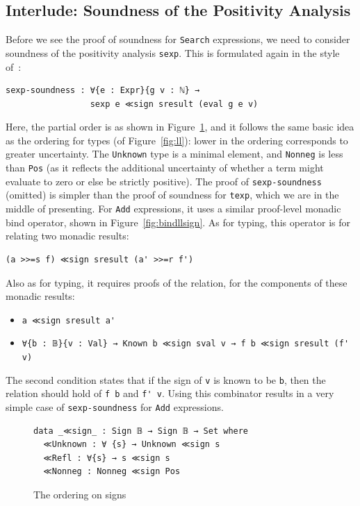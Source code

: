 \documentclass[acmsmall,screen,review]{acmart}
\begin{document}
\subsection{Interlude: Soundness of the Positivity Analysis}

Before we see the proof of soundness for \verb|Search| expressions,
we need to consider soundness of the positivity analysis \verb|sexp|.
This is formulated again in the style of~\citet{garby+25}:
\begin{verbatim}
sexp-soundness : ∀{e : Expr}{g v : ℕ} →
                 sexp e ≪sign sresult (eval g e v)
\end{verbatim}
\noindent Here, the partial order is as shown in
Figure~\ref{fig:signll}, and it follows the same basic idea as the
ordering for types (of Figure~\ref{fig:ll}): lower in the ordering
corresponds to greater uncertainty.  The \verb|Unknown| type is a
minimal element, and \verb|Nonneg| is less than \verb|Pos| (as it
reflects the additional uncertainty of whether a term might evaluate
to zero or else be strictly positive).  The proof of
\verb|sexp-soundness| (omitted) is simpler than the proof of soundness for
\verb|texp|, which we are in the middle of presenting.  For \verb|Add|
expressions, it uses a similar proof-level monadic bind operator,
shown in Figure~\ref{fig:bindllsign}.  As for typing, this operator is
for relating two monadic results:
\begin{verbatim}
(a >>=s f) ≪sign sresult (a' >>=r f')
\end{verbatim}
\noindent Also as for typing, it requires proofs of the relation, for the components of these
monadic results:
\begin{itemize}
\item \verb|a ≪sign sresult a'|
\item \verb|∀{b : 𝔹}{v : Val} → Known b ≪sign sval v → f b ≪sign sresult (f' v)|
\end{itemize}
\noindent The second condition states that if the sign of \verb|v| is known to be \verb|b|, then the
relation should hold of \verb|f b| and \verb|f' v|.  Using this combinator results in a very
simple case of \verb|sexp-soundness| for \verb|Add| expressions.


\begin{figure}
\begin{verbatim}  
data _≪sign_ : Sign 𝔹 → Sign 𝔹 → Set where
  ≪Unknown : ∀ {s} → Unknown ≪sign s
  ≪Refl : ∀{s} → s ≪sign s
  ≪Nonneg : Nonneg ≪sign Pos
\end{verbatim}  
\caption{The ordering on signs}
\label{fig:signll}
\end{figure}
\end{document}
